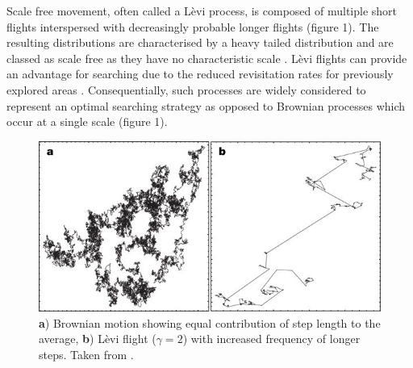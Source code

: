 \documentclass[11pt,usenames,dvipsnames]{article}
\begin{document}
Scale free movement, often called a L\`evi process, is composed of multiple short flights interspersed with decreasingly probable longer flights (figure 1). The resulting distributions are characterised by a heavy tailed distribution and are classed as scale free as they have no characteristic scale \citep{Reynolds2018}. L\`evi flights can provide an advantage for searching due to the reduced revisitation rates for previously explored areas \citep{Viswanathan1999}. Consequentially, such processes are widely considered to represent an optimal searching strategy \citep{Viswanathan1999,Humphries2014} as opposed to Brownian processes which occur at a single scale (figure 1).\\

\begin{figure}[H]
	\centering
	\includegraphics[scale=0.7]{LeviFlight.jpg}
	\caption{\textbf{a}) Brownian motion showing equal contribution of step length to the average, \textbf{b}) L\`evi flight ($\gamma = 2$) with increased frequency of longer steps. Taken from \cite{Barthelemy2008}.}
\end{figure}
\end{document}
